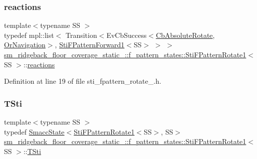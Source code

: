 \subsubsection{\texorpdfstring{reactions}{reactions}}
{\footnotesize\ttfamily template$<$typename SS $>$ \\
typedef mpl\+::list$<$ Transition$<$Ev\+Cb\+Success$<$\hyperlink{classcl__move__base__z_1_1CbAbsoluteRotate}{Cb\+Absolute\+Rotate}, \hyperlink{classsm__ridgeback__floor__coverage__static__1_1_1OrNavigation}{Or\+Navigation}$>$, \hyperlink{classsm__ridgeback__floor__coverage__static__1_1_1f__pattern__states_1_1StiFPatternForward1}{Sti\+F\+Pattern\+Forward1}$<$SS$>$ $>$ $>$ \hyperlink{classsm__ridgeback__floor__coverage__static__1_1_1f__pattern__states_1_1StiFPatternRotate1}{sm\+\_\+ridgeback\+\_\+floor\+\_\+coverage\+\_\+static\+\_\+::f\+\_\+pattern\+\_\+states\+::\+Sti\+F\+Pattern\+Rotate1}$<$ SS $>$\+::\hyperlink{classsm__ridgeback__floor__coverage__static__1_1_1f__pattern__states_1_1StiFPatternRotate1_ab0dfd621289313eafdd92afc1bcd520c}{reactions}}



Definition at line 19 of file sti\+\_\+fpattern\+\_\+rotate\+\_.\+h.

\mbox{\label{classsm__ridgeback__floor__coverage__static__1_1_1f__pattern__states_1_1StiFPatternRotate1_a39616e89c2d08f16604cf0a3f6dbcd45}} 
\subsubsection{\texorpdfstring{T\+Sti}{TSti}}
{\footnotesize\ttfamily template$<$typename SS $>$ \\
typedef \hyperlink{classSmaccState}{Smacc\+State}$<$\hyperlink{classsm__ridgeback__floor__coverage__static__1_1_1f__pattern__states_1_1StiFPatternRotate1}{Sti\+F\+Pattern\+Rotate1}$<$SS$>$, SS$>$ \hyperlink{classsm__ridgeback__floor__coverage__static__1_1_1f__pattern__states_1_1StiFPatternRotate1}{sm\+\_\+ridgeback\+\_\+floor\+\_\+coverage\+\_\+static\+\_\+::f\+\_\+pattern\+\_\+states\+::\+Sti\+F\+Pattern\+Rotate1}$<$ SS $>$\+::\hyperlink{classsm__ridgeback__floor__coverage__static__1_1_1f__pattern__states_1_1StiFPatternRotate1_a39616e89c2d08f16604cf0a3f6dbcd45}{T\+Sti}}



